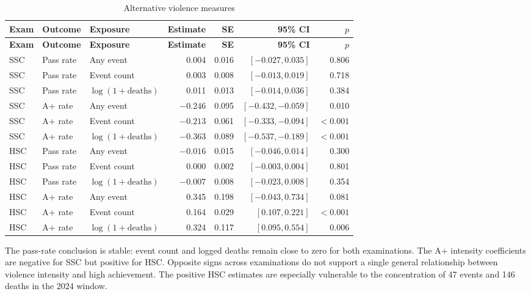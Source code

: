 \documentclass[11pt]{article}
\begin{document}
{\small
\setlength{\tabcolsep}{4pt}
\begin{longtable}{lllrrrr}
\caption{Alternative violence measures}\label{tab:intensity}\\
\toprule
\textbf{Exam} & \textbf{Outcome} & \textbf{Exposure} & \textbf{Estimate} & \textbf{SE} & \textbf{95\% CI} & \textbf{$p$} \\
\midrule
\endfirsthead
\toprule
\textbf{Exam} & \textbf{Outcome} & \textbf{Exposure} & \textbf{Estimate} & \textbf{SE} & \textbf{95\% CI} & \textbf{$p$} \\
\midrule
\endhead
SSC & Pass rate & Any event & 0.004 & 0.016 & $[-0.027,0.035]$ & 0.806 \\
SSC & Pass rate & Event count & 0.003 & 0.008 & $[-0.013,0.019]$ & 0.718 \\
SSC & Pass rate & $\log(1+\text{deaths})$ & 0.011 & 0.013 & $[-0.014,0.036]$ & 0.384 \\
SSC & A+ rate & Any event & $-0.246$ & 0.095 & $[-0.432,-0.059]$ & 0.010 \\
SSC & A+ rate & Event count & $-0.213$ & 0.061 & $[-0.333,-0.094]$ & $<0.001$ \\
SSC & A+ rate & $\log(1+\text{deaths})$ & $-0.363$ & 0.089 & $[-0.537,-0.189]$ & $<0.001$ \\
HSC & Pass rate & Any event & $-0.016$ & 0.015 & $[-0.046,0.014]$ & 0.300 \\
HSC & Pass rate & Event count & 0.000 & 0.002 & $[-0.003,0.004]$ & 0.801 \\
HSC & Pass rate & $\log(1+\text{deaths})$ & $-0.007$ & 0.008 & $[-0.023,0.008]$ & 0.354 \\
HSC & A+ rate & Any event & 0.345 & 0.198 & $[-0.043,0.734]$ & 0.081 \\
HSC & A+ rate & Event count & 0.164 & 0.029 & $[0.107,0.221]$ & $<0.001$ \\
HSC & A+ rate & $\log(1+\text{deaths})$ & 0.324 & 0.117 & $[0.095,0.554]$ & 0.006 \\
\bottomrule
\end{longtable}
}

The pass-rate conclusion is stable: event count and logged deaths remain close to zero for both examinations. The A+ intensity coefficients are negative for SSC but positive for HSC. Opposite signs across examinations do not support a single general relationship between violence intensity and high achievement. The positive HSC estimates are especially vulnerable to the concentration of 47 events and 146 deaths in the 2024 window.
\end{document}
